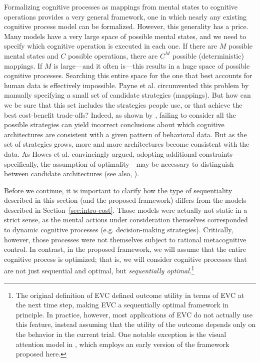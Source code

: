 Formalizing cognitive processes as mappings from mental states to cognitive operations provides a very general framework, one in which nearly any existing cognitive process model can be formalized. However, this generality has a price. Many models have a very large space of possible mental states, and we need to specify which cognitive operation is executed in each one. If there are $M$ possible mental states and $C$ possible operations, there are $C^M$ possible (deterministic) mappings. If $M$ is large---and it often is---this results in a huge space of possible cognitive processes. Searching this entire space for the one that best accounts for human data is effectively impossible. Payne et al. circumvented this problem by manually specifying a small set of candidate strategies (mappings). But how can we be sure that this set includes the strategies people use, or that achieve the best cost-benefit trade-offs? Indeed, as shown by \citet{howes2009rational}, failing to consider all the possible strategies can yield incorrect conclusions about which cognitive architectures are consistent with a given pattern of behavioral data. But as the set of strategies grows, more and more architectures become consistent with the data. As Howes et al. convincingly argued, adopting additional constraints---specifically, the assumption of optimality---may be necessary to distinguish between candidate architectures (see also, \citealp{lewis2014computational}).

Before we continue, it is important to clarify how the type of sequentiality described in this section (and the proposed framework) differs from the models described in Section~\ref{sec:intro-cost}. Those models were actually not static in a strict sense, as the mental actions under consideration themselves corresponded to dynamic cognitive processes (e.g. decision-making strategies). Critically, however, those processes were not themselves subject to rational metacognitive control. In contrast, in the proposed framework, we will assume that the entire cognitive process is optimized; that is, we will consider cognitive processes that are not just sequential and optimal, but \emph{sequentially optimal}.\footnote{%
  The original definition of EVC \citep{shenhav2013expected} defined outcome utility in terms of EVC at the next time step, making EVC a sequentially optimal framework in principle. In practice, however, most applications of EVC do not actually use this feature, instead assuming that the utility of the outcome depends only on the behavior in the current trial. One notable exception is the visual attention model in \citet{lieder2018rational}, which employs an early version of the framework proposed here.
}




